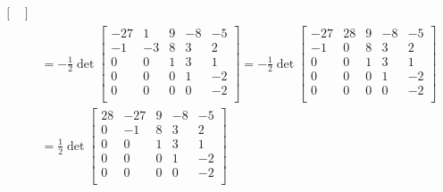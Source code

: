 \documentclass{article}
\begin{document}
\[\begin{aligned}
{\begin{bmatrix}
    \end{bmatrix}} \\ &= - \frac{1}{2}\det{\begin{bmatrix}
        -27 &  1 & 9 & -8 & -5 \\
         -1 & -3 & 8 &  3 &  2 \\
          0 &  0 & 1 &  3 &  1 \\
          0 &  0 & 0 &  1 & -2 \\
          0 &  0 & 0 &  0 & -2 \\
    \end{bmatrix}} = - \frac{1}{2}\det{\begin{bmatrix}
        -27 & 28 & 9 & -8 & -5 \\
         -1 &  0 & 8 &  3 &  2 \\
          0 &  0 & 1 &  3 &  1 \\
          0 &  0 & 0 &  1 & -2 \\
          0 &  0 & 0 &  0 & -2 \\
    \end{bmatrix}} \\ &= \frac{1}{2}\det{\begin{bmatrix}
        28 & -27 & 9 & -8 & -5 \\
         0 &  -1 & 8 &  3 &  2 \\
         0 &   0 & 1 &  3 &  1 \\
         0 &   0 & 0 &  1 & -2 \\
         0 &   0 & 0 &  0 & -2 \\
    \end{bmatrix}}
\end{aligned}\]
\end{document}
